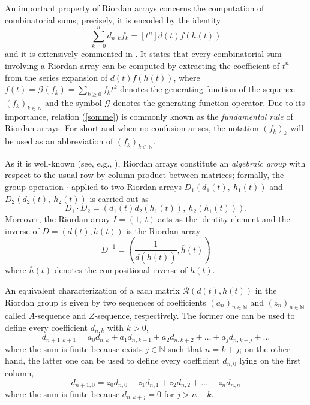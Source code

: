 An important property of Riordan arrays concerns the computation of
combinatorial sums; precisely, it is encoded by the identity
\begin{equation}
    \label{somme}
    \sum_{k=0}^n d_{n,k}f_k=[t^n]d(t)f(h(t))
\end{equation}
and it is extensively commented in
\citep{LUZON2012631,Merlini:2009:CSI:2653507.2654195,SPRUGNOLI1994267}.
It states that every combinatorial sum involving a Riordan array can be computed by
extracting the coefficient of $t^n$ from the series expansion of $d(t)f(h(t))$,
where $f(t)=\mathcal{G}(f_k)=\sum_{k\geq 0}f_kt^k$ denotes the generating function
of the sequence $(f_k)_{k \in\mathbb{N}}$ and the symbol $\mathcal{G}$
denotes the generating function operator. Due to its importance, relation
(\ref{somme}) is commonly known as the \textit{fundamental rule} of Riordan arrays.
For short and when no confusion arises, the notation $(f_k)_{k}$ will be used
as an abbreviation of $(f_k)_{k\in\mathbb{N}}$.

As it is well-known (see, e.g., \citep{LUZON201475,MRSV97,SHAPIRO1991229}),
Riordan arrays constitute an \textit{algebraic group} with respect to the usual
row-by-column product between matrices; formally, the group operation $\cdot$ applied
to two Riordan arrays $D_1(d_1(t),\ h_1(t))$ and $D_2(d_2(t),\ h_2(t))$ is
carried out as
\begin{equation}
  D_1 \cdot D_2 =(d_1(t)d_2(h_1(t)),\ h_2(h_1(t))).
  \label{eq:riordan:group:op}
\end{equation}
Moreover, the Riordan array $I = (1,\ t)$ acts as the identity element and the
inverse of $D =(d(t), h(t))$ is the Riordan array
\begin{equation}
D^{-1} = \left( \frac{1}{d(\overline{h}(t))}, \overline{h}(t) \right)
  \label{eq:riordan:group:inverse}
\end{equation}
where $\overline{h}(t)$ denotes the compositional inverse of $h(t)$.

An equivalent characterization of a each matrix $\mathcal{R}(d(t), h(t))$ in
the Riordan group is given by two sequences of coefficients
$\left(a_{n}\right)_{n\in\mathbb{N}}$  and
$\left(z_{n}\right)_{n\in\mathbb{N}}$ called $A$-sequence and $Z$-sequence,
respectively. The former one can be used to define every
coefficient $d_{n,k}$ with $k>0$,
\begin{displaymath}
    d_{n+1, k+1} = a_{0}d_{n,k} + a_{1}d_{n,k+1} + a_{2}d_{n,k+2} + \ldots + a_{j}d_{n,k+j} + \ldots %
\end{displaymath}
where the sum is finite because exists $j\in\mathbb{N}$ such that $n=k+j$; on
the other hand, the latter one can be used to define every coefficient
$d_{n,0}$ lying on the first column,
\begin{displaymath}
    d_{n+1, 0} = z_{0}d_{n,0} + z_{1}d_{n,1} + z_{2}d_{n,2} + \ldots + z_{n}d_{n,n}
\end{displaymath}
where the sum is finite because $d_{n,k+j}=0$ for $j>n-k$.

